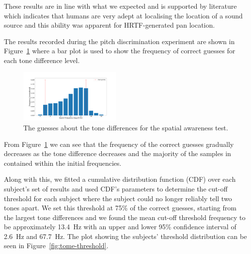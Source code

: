 \documentclass[format=sigconf, review=true, screen=true, anonymous=true]{acmart}
\begin{document}
These results are in line with what we expected and is supported by literature which indicates that humans are very adept at localising the location of a sound source and this ability was apparent for HRTF-generated pan location. 


The results recorded during the pitch discrimination experiment are shown in Figure~\ref{fig:tone-guesses} where a bar plot is used to show the frequency of correct guesses for each tone difference level. 

\begin{figure}
  \centering
  \includegraphics[width=0.45\textwidth]{figures/tone_guesses.png}
  \caption{The guesses about the tone differences for the spatial awareness test.}
  \label{fig:tone-guesses}
\end{figure}

From Figure~\ref{fig:tone-guesses} we can see that the frequency of the correct guesses gradually decreases as the tone difference decreases and the majority of the samples in contained within the initial frequencies. 

Along with this, we fitted a cumulative distribution function (CDF) over each subject's set of results and used CDF's parameters to determine the cut-off threshold for each subject where the subject could no longer reliably tell two tones apart. We set this threshold at 75\% of the correct guesses, starting from the largest tone differences and we found the mean cut-off threshold frequency to be approximately \SI{13.4}{\hertz} with an upper and lower 95\% confidence interval of \SI{2.6}{\hertz} and \SI{67.7}{\hertz}. The plot showing the subjects' threshold distribution can be seen in Figure~\ref{fig:tome-threshold}. 
\end{document}
